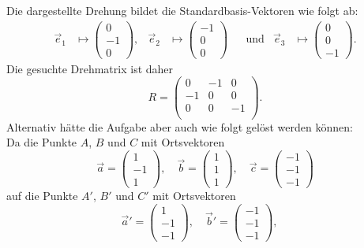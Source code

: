 \begin{loesung}
\begin{teilaufgaben}
\item
Die dargestellte Drehung bildet die Standardbasis-Vektoren wie folgt ab:
\[
\begin{aligned}
\vec e_1&\mapsto \begin{pmatrix}0\\-1\\0\end{pmatrix},
&
\vec e_2&\mapsto \begin{pmatrix}-1\\0\\0\end{pmatrix}
&&\text{und}
&
\vec e_3&\mapsto \begin{pmatrix}0\\0\\-1\end{pmatrix}.
\end{aligned}
\]
Die gesuchte Drehmatrix ist daher
\[
R
=
\begin{pmatrix}
0&-1& 0\\
-1&0& 0\\
0&0& -1\\
\end{pmatrix}.
\]
Alternativ hätte die Aufgabe aber auch wie folgt gelöst werden können:\\
Da die Punkte $A$, $B$ und $C$ mit Ortsvektoren
\[
  \vec a = \begin{pmatrix}1\\-1\\1\end{pmatrix},\quad
  \vec b = \begin{pmatrix}1\\1\\1\end{pmatrix},\quad
  \vec c = \begin{pmatrix}-1\\-1\\-1\end{pmatrix}                          
\]
auf die Punkte $A'$, $B'$ und $C'$ mit Ortsvektoren
\[
  \vec a' = \begin{pmatrix}1\\-1\\-1\end{pmatrix},\quad
  \vec b' = \begin{pmatrix}-1\\-1\\-1\end{pmatrix},\quad
\]
\end{teilaufgaben}
\end{loesung}
